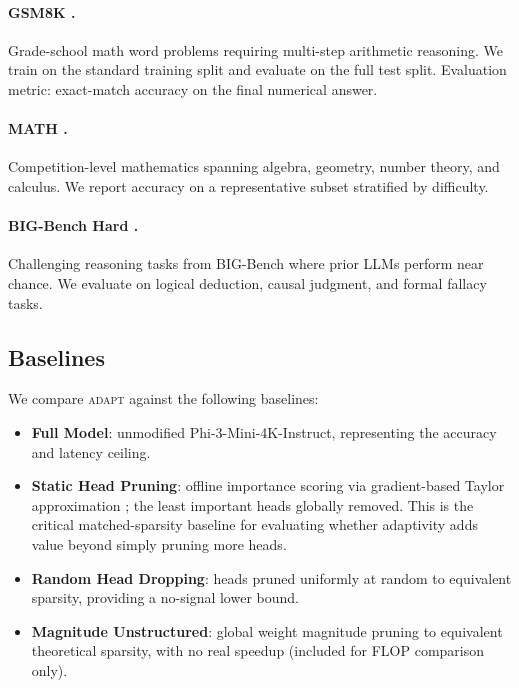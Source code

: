 \documentclass{article}
\newcommand{\system}{\textsc{adapt}}
\begin{document}
\paragraph{GSM8K \citep{cobbe2021gsm8k}.}
Grade-school math word problems requiring multi-step arithmetic reasoning. We train on the
standard training split and evaluate on the full test split. Evaluation metric: exact-match
accuracy on the final numerical answer.

\paragraph{MATH \citep{hendrycks2021math}.}
Competition-level mathematics spanning algebra, geometry, number theory, and calculus.
We report accuracy on a representative subset stratified by difficulty.

\paragraph{BIG-Bench Hard \citep{suzgun2022challenging}.}
Challenging reasoning tasks from BIG-Bench where prior LLMs perform near chance.
We evaluate on logical deduction, causal judgment, and formal fallacy tasks.

\subsection{Baselines}
\label{sec:exp_baselines}

We compare \system{} against the following baselines:

\begin{itemize}
  \item \textbf{Full Model}: unmodified Phi-3-Mini-4K-Instruct, representing the accuracy
        and latency ceiling.
  \item \textbf{Static Head Pruning}: offline importance scoring via gradient-based Taylor
        approximation \citep{michel2019sixteen}; the least important heads globally removed.
        This is the critical matched-sparsity baseline for evaluating whether adaptivity
        adds value beyond simply pruning more heads.
  \item \textbf{Random Head Dropping}: heads pruned uniformly at random to equivalent
        sparsity, providing a no-signal lower bound.
  \item \textbf{Magnitude Unstructured}: global weight magnitude pruning to equivalent
        theoretical sparsity, with no real speedup (included for FLOP comparison only).
\end{itemize}
\end{document}
